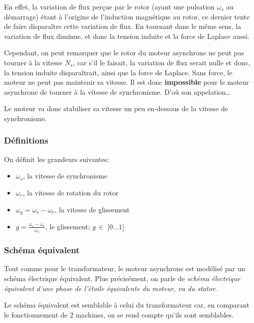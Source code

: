 \documentclass[11pt]{article}
\providecommand{\tightlist}{%
      \setlength{\itemsep}{0pt}\setlength{\parskip}{0pt}}
\begin{document}
    En effet, la variation de flux perçue par le rotor (ayant une pulsation
\(\omega_s\) au démarrage) étant à l'origine de l'induction magnétique
au rotor, ce dernier tente de faire disparaître cette variation de flux.
En tournant dans le même sens, la variation de flux diminue, et donc la
tension induite et la force de Laplace aussi.

    Cependant, on peut remarquer que le rotor du moteur asynchrone ne peut
pas tourner à la vitesse \(N_s\), car s'il le faisait, la variation de
flux serait nulle et donc, la tension induite disparaîtrait, ainsi que
la force de Laplace. Sans force, le moteur ne peut pas maintenir sa
vitesse. Il est donc \textbf{impossible} pour le moteur asynchrone de
tourner à la vitesse de synchronisme. D'où son appelation\ldots{}

    Le moteur va donc stabiliser sa vitesse un peu en-dessous de la vitesse
de synchronisme.

    \hypertarget{duxe9finitions}{%
\subsubsection{Définitions}\label{duxe9finitions}}

    On définit les grandeurs suivantes:

\begin{itemize}
\tightlist
\item
  \(\omega_s\), la vitesse de synchronisme
\item
  \(\omega_r\), la vitesse de rotation du rotor
\item
  \(\omega_g=\omega_s-\omega_r\), la vitesse de glissement
\item
  \(g=\frac{\omega_s-\omega_r}{\omega_s}\), le glissement;
  \(g\, \in\; ]0 \dots 1]\)
\end{itemize}

    \hypertarget{schuxe9ma-uxe9quivalent}{%
\subsubsection{Schéma équivalent}\label{schuxe9ma-uxe9quivalent}}

    Tout comme pour le transformateur, le moteur asynchrone est modélisé par
un schéma électrique équivalent. Plus précisément, on parle de
\emph{schéma électrique équivalent d'une phase de l'étoile équivalente
du moteur, vu du stator}.

    Le schéma équivalent est semblable à celui du transformateur car, en
comparant le fonctionnement de 2 machines, on se rend compte qu'ils sont
semblables.
\end{document}
